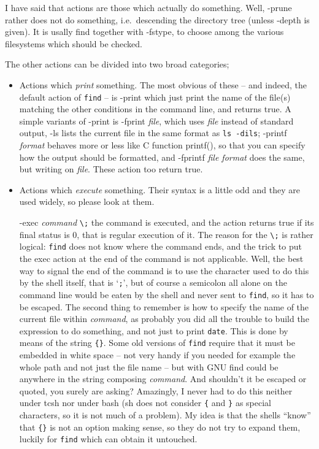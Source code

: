 I have said that actions are those which actually do something. Well, {\sf
-prune} rather does not do something, i.e.\ descending the directory tree
(unless -depth is given). It is usally find together with -fstype, to
choose among the various filesystems which should be checked.

The other actions can be divided into two broad categories;

\begin{itemize}

\item Actions which {\em print\/} something. The most obvious of these --
and indeed, the default action of {\tt find} -- is {\sf -print} which just
print the name of the file(s) matching the other conditions in the command
line, and returns true. A simple variants of -print is {\sf -fprint {\em
file\/}}, which uses {\em file\/} instead of standard output, {\sf -ls}
lists the current file in the same format as {\tt ls -dils}; {\sf -printf
{\em format\/}} behaves more or less like C function printf(), so that you
can specify how the output should be formatted, and {\sf -fprintf {\em
file format\/}} does the same, but writing on {\em file}. These action too
return true.

\item Actions which {\em execute\/} something. Their syntax is a little
odd and they are used widely, so please look at them.

{\sf -exec {\em command\/} \verb-\;-} the command is executed, and the
action returns true if its final status is 0, that is regular execution
of it.  The reason for the {\tt \verb-\;-} is rather logical: {\tt find}
does not know where the command ends, and the trick to put the exec
action at the end of the command is not applicable. Well, the best way
to signal the end of the command is to use the character used to do this
by the shell itself, that is `{\tt ;}', but of course a semicolon all
alone on the command line would be eaten by the shell and never sent to
{\tt find}, so it has to be escaped. The second thing to remember is how
to specify the name of the current file within {\em command}, as
probably you did all the trouble to build the expression to do
something, and not just to print {\tt date}. This is done by means of the
string \verb-{}-. Some old versions of {\tt find} require that it must
be embedded in white space -- not very handy if you needed for example
the whole path and not just the file name -- but with GNU find could be
anywhere in the string composing {\em command}. And shouldn't it be
escaped or quoted, you surely are asking? Amazingly, I never had to do
this neither under tcsh nor under bash (sh does not consider \verb-{- and
\verb-}- as special characters, so it is not much of a problem). My idea
is that the shells ``know'' that \verb-{}- is not an option making sense,
so they do not try to expand them, luckily for {\tt find} which can obtain
it untouched.


\end{itemize}
